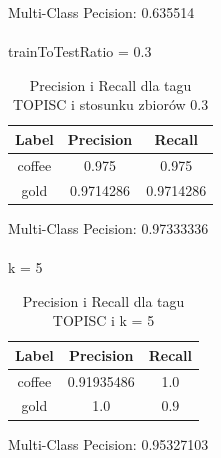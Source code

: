 \documentclass{classrep}
\begin{document}
Multi-Class Pecision: 0.635514\\
\\
trainToTestRatio = 0.3
\begin{table}[H]
\begin{tabular}{|c|c|c|}
\hline
Label  & Precision & Recall    \\ \hline
coffee & 0.975     & 0.975     \\ \hline
gold   & 0.9714286 & 0.9714286 \\ \hline
\end{tabular}
\caption{Precision i Recall dla tagu TOPISC i stosunku zbiorów 0.3}
\end{table}
Multi-Class Pecision: 0.97333336\\
\\
k = 5
\begin{table}[H]
\begin{tabular}{|c|c|c|}
\hline
Label  & Precision  & Recall \\ \hline
coffee & 0.91935486 & 1.0    \\ \hline
gold   & 1.0        & 0.9    \\ \hline
\end{tabular}
\caption{Precision i Recall dla tagu TOPISC i k = 5}
\end{table}
Multi-Class Pecision: 0.95327103
\end{document}
